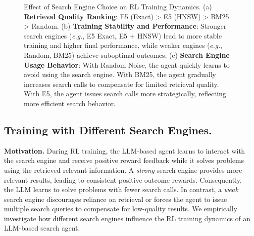 \begin{figure}[t]
    \centering
    
    \caption{
Effect of Search Engine Choice on RL Training Dynamics.
(a) \textbf{Retrieval Quality Ranking}: E5 (Exact) > E5 (HNSW) > BM25 > Random.
(b) \textbf{Training Stability and Performance}: Stronger search engines (\textit{e.g.}, E5 Exact, E5 + HNSW) lead to more stable training and higher final performance, while weaker engines (\textit{e.g.}, Random, BM25) achieve suboptimal outcomes.
(c) \textbf{Search Engine Usage Behavior}: With Random Noise, the agent quickly learns to avoid using the search engine. With BM25, the agent gradually increases search calls to compensate for limited retrieval quality. With E5, the agent issues search calls more strategically, reflecting more efficient search behavior.
}\label{fig:retriever-training-study}

\end{figure}

\subsection{Training with Different Search Engines.}\label{sec:train-engine}

\textbf{Motivation.}
During RL training, the LLM-based agent learns to interact with the search engine and receive positive reward feedback while it solves problems using the retrieved relevant information. 
A \textit{strong} search engine provides more relevant results, leading to consistent positive outcome rewards. Consequently, the LLM learns to solve problems with fewer search calls. 
In contrast, a \textit{weak} search engine discourages reliance on retrieval or forces the agent to issue multiple search queries to compensate for low-quality results. 
We empirically investigate how different search engines influence the RL training dynamics of an LLM-based search agent.

